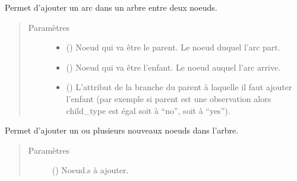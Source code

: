 \documentclass[letterpaper,10pt,french]{sphinxmanual}
\begin{document}
\begin{fulllineitems}
\begin{fulllineitems}
\label{\detokenize{index:StrategyTree.StrategyTree.add_edge}}
Permet d’ajouter un arc dans un arbre entre deux noeuds.
\begin{quote}\begin{description}
\item[{Paramètres}] \leavevmode\begin{itemize}
\item {} 
 () \textendash{} Noeud qui va être le parent. Le noeud duquel l’arc part.

\item {} 
 () \textendash{} Noeud qui va être l’enfant. Le noeud auquel l’arc arrive.

\item {} 
 (\sphinxstyleliteralemphasis{\sphinxupquote{, }}) \textendash{} L’attribut de la branche du parent à laquelle il faut ajouter
l’enfant (par exemple si parent est une observation alors
child\_type est égal soit à “no”, soit à “yes”).

\end{itemize}

\end{description}\end{quote}

\end{fulllineitems}


\begin{fulllineitems}
\label{\detokenize{index:StrategyTree.StrategyTree.add_node}}
Permet d’ajouter un ou plusieurs nouveaux noeuds dans l’arbre.
\begin{quote}\begin{description}
\item[{Paramètres}] \leavevmode
{} (\sphinxstyleliteralemphasis{\sphinxupquote{)}}) \textendash{} Noeud.s à ajouter.


\end{description}
\end{quote}
\end{fulllineitems}
\end{fulllineitems}
\end{document}
